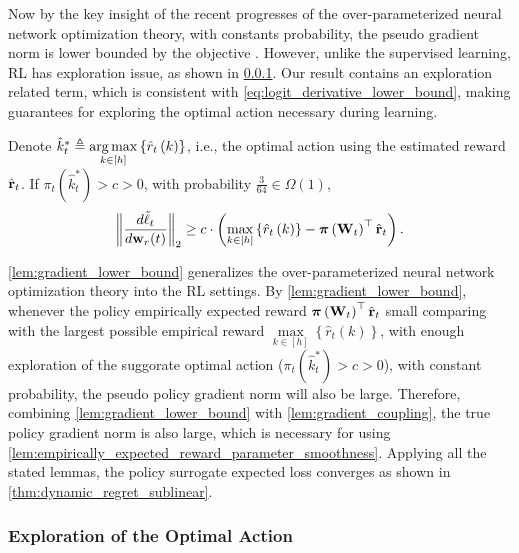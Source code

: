 Now by the key insight of the recent progresses of the over-parameterized neural network optimization theory, with constants probability, the pseudo gradient norm is lower bounded by the objective \citep{li2018learning}. However, unlike the supervised learning, RL has exploration issue, as shown in \cref{subsubsec:exploration_in_policy_learning}. Our result contains an exploration related term, which is consistent with \cref{eq:logit_derivative_lower_bound}, making guarantees for exploring the optimal action necessary during learning.

\begin{lem}
\label{lem:gradient_lower_bound}
	Denote $\hat{k}_t^* \triangleq \operatorname*{arg\,max}\limits_{k \in [h]}\left\{ \hat{r}_{t}\left(k\right) \right\}$, i.e., the optimal action using the estimated reward $ \hat{{\mathbf{r}}}_t$. If $\pi_t\left(\hat{k}_t^*\right) > c > 0$, with probability $\frac{3}{64} \in \Omega\left( 1 \right)$,
\begin{equation*}
\begin{split}
	\left\| \frac{d\tilde{\ell}_t}{d {\mathbf{w}}_r(t)} \right\|_2 \ge c \cdot \left( \max\limits_{k \in \left[h\right]}\left\{ \hat{r}_{t}\left(k\right) \right\} - {\boldsymbol{\pi}}\left( {\mathbf{W}}_t \right)^\top \hat{{\mathbf{r}}}_t \right) .
\end{split}
\end{equation*}
\end{lem}

\cref{lem:gradient_lower_bound} generalizes the over-parameterized neural network optimization theory into the RL settings. By \cref{lem:gradient_lower_bound}, whenever the policy empirically expected reward ${\boldsymbol{\pi}}\left( {\mathbf{W}}_t \right)^\top \hat{{\mathbf{r}}}_t$ small comparing with the largest possible empirical reward $\max\limits_{k \in \left[h\right]}\left\{ \hat{r}_{t}\left(k\right) \right\}$, with enough exploration of the suggorate optimal action ($\pi_t\left(\hat{k}_t^*\right) > c > 0$), with constant probability, the pseudo policy gradient norm will also be large. Therefore, combining \cref{lem:gradient_lower_bound} with \cref{lem:gradient_coupling}, the true policy gradient norm is also large, which is necessary for using \cref{lem:empirically_expected_reward_parameter_smoothness}. Applying all the stated lemmas, the policy surrogate expected loss converges as shown in \cref{thm:dynamic_regret_sublinear}.

\subsubsection{Exploration of the Optimal Action}
\label{subsubsec:exploration_in_policy_learning}

